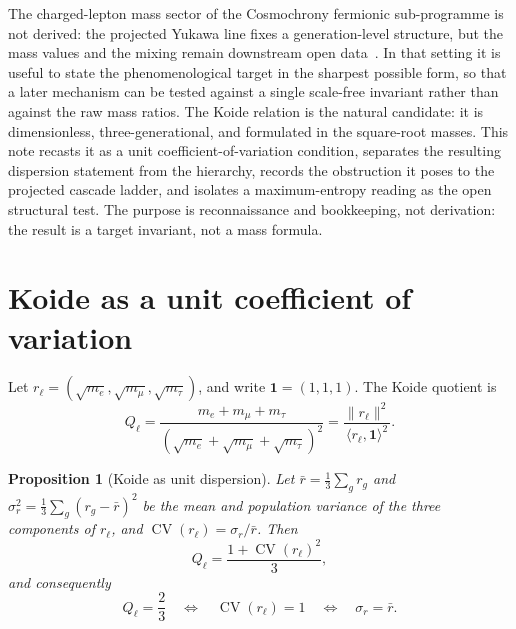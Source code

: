 \documentclass[11pt]{article}
\newtheorem{proposition}{Proposition}
\theoremstyle{definition}
\theoremstyle{remark}
\newcommand{\CV}{\operatorname{CV}}
\newcommand{\rl}{r_{\ell}}
\begin{document}
    The charged-lepton mass sector of the Cosmochrony fermionic sub-programme is not derived: the projected Yukawa
    line fixes a generation-level structure, but the mass values and the mixing remain downstream open
    data~\cite{Beau2026pyl, Beau2026pyo}.
    In that setting it is useful to state the phenomenological target in the sharpest possible form, so that a
    later mechanism can be tested against a single scale-free invariant rather than against the raw mass ratios.
    The Koide relation is the natural candidate: it is dimensionless, three-generational, and formulated in the
    square-root masses.
    This note recasts it as a unit coefficient-of-variation condition, separates the resulting dispersion
    statement from the hierarchy, records the obstruction it poses to the projected cascade ladder, and isolates a
    maximum-entropy reading as the open structural test.
    The purpose is reconnaissance and bookkeeping, not derivation: the result is a target invariant, not a mass
    formula.

  \section{Koide as a unit coefficient of variation}
    \label{sec:cv}

    Let $\rl = (\sqrt{m_e}, \sqrt{m_\mu}, \sqrt{m_\tau})$, and write $\mathbf 1 = (1,1,1)$.
    The Koide quotient is
    \begin{equation}
      \label{eq:koide}
      Q_\ell
      = \frac{m_e + m_\mu + m_\tau}{(\sqrt{m_e} + \sqrt{m_\mu} + \sqrt{m_\tau})^2}
      = \frac{\lVert \rl \rVert^2}{\langle \rl, \mathbf 1 \rangle^2}.
    \end{equation}

    \begin{proposition}[Koide as unit dispersion]
      \label{prop:cv}
      Let $\bar r = \tfrac13 \sum_g r_g$ and $\sigma_r^2 = \tfrac13 \sum_g (r_g - \bar r)^2$ be the mean and
      population variance of the three components of $\rl$, and $\CV(\rl) = \sigma_r/\bar r$.
      Then
      \begin{equation}
        \label{eq:cv-identity}
        Q_\ell = \frac{1 + \CV(\rl)^2}{3},
      \end{equation}
      and consequently
      \begin{equation}
        \label{eq:cv-unit}
        Q_\ell = \frac23 \quad\Longleftrightarrow\quad \CV(\rl) = 1 \quad\Longleftrightarrow\quad \sigma_r = \bar r.
      \end{equation}
    \end{proposition}
\end{document}
